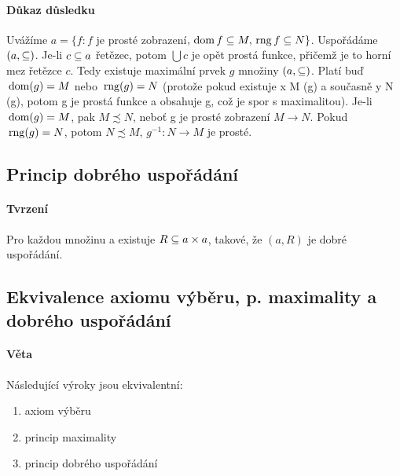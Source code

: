 \documentclass[a4paper,12pt,titlepage]{article}
\begin{document}
\begin{enumerate}
\paragraph{Důkaz důsledku}
Uvážíme $a = \{ f: f$ je prosté zobrazení$, \operatorname*{\,dom} f \subseteq M, \operatorname*{\,rng} f \subseteq N
\}$. Uspořádáme $(a, \subseteq)$. Je-li $c \subseteq a$ řetězec, potom $\bigcup c$
je opět prostá funkce, přičemž je to horní mez řetězce $c$. Tedy existuje
maximální prvek $g$ množiny $(a,\subseteq)$. Platí buď $\operatorname*{\,dom}(g) = M$ nebo $\operatorname*{\,rng}(g) =
N$ (protože pokud existuje x \in M \setminus \dom(g) a současně y \in N \setminus
\rng(g), potom g  je prostá funkce a obsahuje g, což je spor s
maximalitou). Je-li $\operatorname*{\,dom}(g) = M$, pak $M \precsim N$, neboť g je prosté
zobrazení $M \to N$. Pokud $\operatorname*{\,rng}(g) = N$, potom $N \precsim M$, $g^{-1}: N \to
M$ je prosté.


\subsection{Princip dobrého uspořádání}
\setcounter{equation}{0}
\paragraph{Tvrzení}
Pro každou množinu a existuje $R \subseteq a \times a$, takové, že $(a, R)$ je dobré uspořádání.

\subsection{Ekvivalence axiomu výběru, p. maximality a dobrého uspořádání}
\setcounter{equation}{0}
\paragraph{Věta}
Následující výroky jsou ekvivalentní:
\begin{enumerate}
	\item axiom výběru
	\item princip maximality
	\item princip dobrého uspořádání
\end{enumerate}

\end{enumerate}
\end{document}
